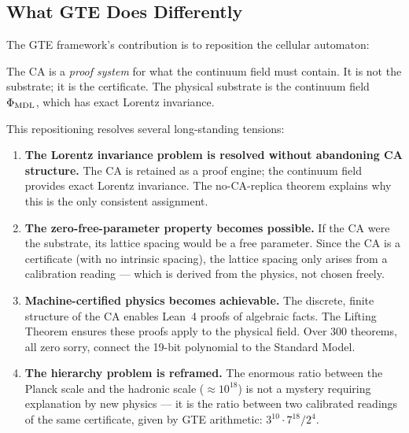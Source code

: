 \documentclass[11pt,a4paper]{article}
\newcommand{\PhiMDL}{\Phi_{\rm MDL}}
\theoremstyle{definition}
\begin{document}
\subsection{What GTE Does Differently}

The GTE framework's contribution is to reposition the cellular automaton:

\begin{tcolorbox}[colback=boxorange,colframe=orange!60!black,
  title=The GTE repositioning]
The CA is a \emph{proof system} for what the continuum field must contain.
It is not the substrate; it is the certificate.
The physical substrate is the continuum field $\PhiMDL$, which has
exact Lorentz invariance.
\end{tcolorbox}

\noindent
This repositioning resolves several long-standing tensions:

\begin{enumerate}[itemsep=6pt]
  \item \textbf{The Lorentz invariance problem is resolved without abandoning CA
    structure.}
    The CA is retained as a proof engine; the continuum field provides exact
    Lorentz invariance.  The no-CA-replica theorem explains why this is the
    only consistent assignment.

  \item \textbf{The zero-free-parameter property becomes possible.}
    If the CA were the substrate, its lattice spacing would be a free parameter.
    Since the CA is a certificate (with no intrinsic spacing), the lattice spacing
    only arises from a calibration reading --- which is derived from the physics,
    not chosen freely.

  \item \textbf{Machine-certified physics becomes achievable.}
    The discrete, finite structure of the CA enables Lean~4 proofs of algebraic
    facts.  The Lifting Theorem ensures these proofs apply to the physical field.
    Over 300 theorems, all zero sorry, connect the 19-bit polynomial to the
    Standard Model.

  \item \textbf{The hierarchy problem is reframed.}
    The enormous ratio between the Planck scale and the hadronic scale
    ($\approx 10^{18}$) is not a mystery requiring explanation by new physics ---
    it is the ratio between two calibrated readings of the same certificate,
    given by GTE arithmetic: $3^{10} \cdot 7^{18}/2^4$.
\end{enumerate}
\end{document}

